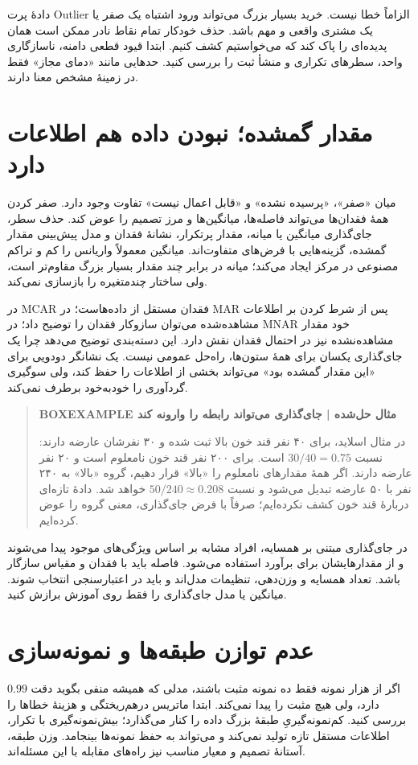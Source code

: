 دادهٔ پرت Outlier الزاماً خطا نیست. خرید بسیار بزرگ می‌تواند ورود اشتباه یک صفر یا یک مشتری واقعی و مهم باشد. حذف خودکار تمام نقاط نادر ممکن است همان پدیده‌ای را پاک کند که می‌خواستیم کشف کنیم. ابتدا قیود قطعی دامنه، ناسازگاری واحد، سطرهای تکراری و منشأ ثبت را بررسی کنید. حدهایی مانند «دمای مجاز» فقط در زمینهٔ مشخص معنا دارند.

\section{مقدار گمشده؛ نبودن داده هم اطلاعات دارد}
میان «صفر»، «پرسیده نشده» و «قابل اعمال نیست» تفاوت وجود دارد. صفر کردن همهٔ فقدان‌ها می‌تواند فاصله‌ها، میانگین‌ها و مرز تصمیم را عوض کند. حذف سطر، جای‌گذاری میانگین یا میانه، مقدار پرتکرار، نشانهٔ فقدان و مدل پیش‌بینی مقدار گمشده، گزینه‌هایی با فرض‌های متفاوت‌اند. میانگین معمولاً واریانس را کم و تراکم مصنوعی در مرکز ایجاد می‌کند؛ میانه در برابر چند مقدار بسیار بزرگ مقاوم‌تر است، ولی ساختار چندمتغیره را بازسازی نمی‌کند.

در MCAR فقدان مستقل از داده‌هاست؛ در MAR پس از شرط کردن بر اطلاعات مشاهده‌شده می‌توان سازوکار فقدان را توضیح داد؛ در MNAR خود مقدار مشاهده‌نشده نیز در احتمال فقدان نقش دارد. این دسته‌بندی توضیح می‌دهد چرا یک جای‌گذاری یکسان برای همهٔ ستون‌ها، راه‌حل عمومی نیست. یک نشانگر دودویی برای «این مقدار گمشده بود» می‌تواند بخشی از اطلاعات را حفظ کند، ولی سوگیری گردآوری را خودبه‌خود برطرف نمی‌کند.

\begin{quote}\textbf{BOXEXAMPLE مثال حل‌شده | جای‌گذاری می‌تواند رابطه را وارونه کند}\par 
در مثال اسلاید، برای ۴۰ نفر قند خون بالا ثبت شده و ۳۰ نفرشان عارضه دارند: نسبت $30/40=0.75$ است. برای ۲۰۰ نفر قند خون نامعلوم است و ۲۰ نفر عارضه دارند. اگر همهٔ مقدارهای نامعلوم را «بالا» قرار دهیم، گروه «بالا» به ۲۴۰ نفر با ۵۰ عارضه تبدیل می‌شود و نسبت $50/240\approx0.208$ خواهد شد. دادهٔ تازه‌ای دربارهٔ قند خون کشف نکرده‌ایم؛ صرفاً با فرض جای‌گذاری، معنی گروه را عوض کرده‌ایم.
\end{quote}

در جای‌گذاری مبتنی بر همسایه، افراد مشابه بر اساس ویژگی‌های موجود پیدا می‌شوند و از مقدارهایشان برای برآورد استفاده می‌شود. فاصله باید با فقدان و مقیاس سازگار باشد. تعداد همسایه و وزن‌دهی، تنظیمات مدل‌اند و باید در اعتبارسنجی انتخاب شوند. میانگین یا مدل جای‌گذاری را فقط روی آموزش برازش کنید.

\section{عدم توازن طبقه‌ها و نمونه‌سازی}
اگر از هزار نمونه فقط ده نمونه مثبت باشند، مدلی که همیشه منفی بگوید دقت $0.99$ دارد، ولی هیچ مثبت را پیدا نمی‌کند. ابتدا ماتریس درهم‌ریختگی و هزینهٔ خطاها را بررسی کنید. کم‌نمونه‌گیریِ طبقهٔ بزرگ داده را کنار می‌گذارد؛ بیش‌نمونه‌گیری با تکرار، اطلاعات مستقل تازه تولید نمی‌کند و می‌تواند به حفظ نمونه‌ها بینجامد. وزن طبقه، آستانهٔ تصمیم و معیار مناسب نیز راه‌های مقابله با این مسئله‌اند.

